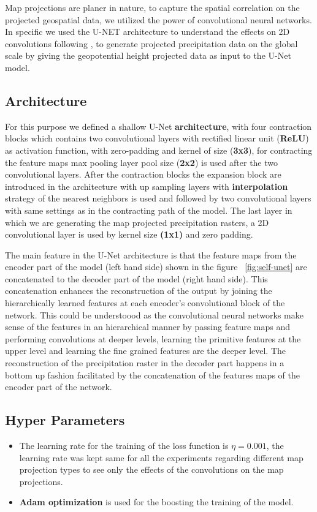 Map projections are planer in nature, to capture the spatial correlation on the projected geospatial data, we utilized the power of convolutional neural networks.
In specific we used the U-NET \cite{ronneberger2015unet}  architecture to understand the effects on 2D convolutions following \cite{trebing2021smaatunet}, to generate projected precipitation data on the global scale by giving the geopotential height projected data as input to the U-Net model.

\subsection*{Architecture}
For this purpose we defined a shallow U-Net \textbf{architecture}, with four contraction blocks which contains two convolutional layers with rectified linear unit (\textbf{ReLU}) as activation function, with zero-padding and kernel of size (\textbf{3x3}), for contracting the feature maps max pooling layer pool size (\textbf{2x2}) is used after the two convolutional layers.
After the contraction blocks the expansion block are introduced in the architecture with up sampling layers with \textbf{interpolation} strategy of the nearest neighbors is used and followed by two convolutional layers with same settings as in the contracting path of the model.
The last layer in which we are generating the map projected precipitation rasters, a 2D convolutional layer is used by kernel size  \textbf{(1x1)} and zero padding.

The main feature in the U-Net architecture is that the feature maps from the encoder part of the model (left hand side) shown in the figure ~\ref{fig:self-unet} are concatenated to the decoder part of the model (right hand side).
This concatenation enhances the reconstruction of the output by joining the hierarchically learned features at each encoder's convolutional block of the network. This could be understoood as the convolutional neural networks make sense of the features in an hierarchical manner by passing feature maps and performing convolutions at deeper levels, learning the primitive features at the upper level and learning the fine grained features are the deeper level. The reconstruction of the precipitation raster in the decoder part happens in a bottom up fashion facilitated by the concatenation of the features maps of the encoder part of the network.

\subsection*{Hyper Parameters}
\begin{itemize}
    \item The learning rate for the training of the loss function is $\eta = 0.001$, the learning rate was kept same for all the experiments regarding different map projection types to see only the effects of the convolutions on the map projections.
    \item \textbf{Adam optimization} is used for the boosting the training of the model.
\end{itemize}

